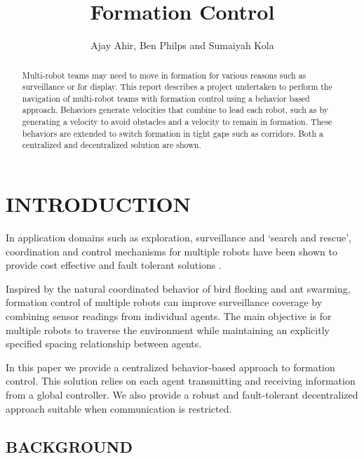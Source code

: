 \documentclass[letterpaper, 10 pt, conference]{ieeeconf}  %
\title{\LARGE \bf Formation Control}
\author{Ajay Ahir, Ben Philps and Sumaiyah Kola}
\begin{document}
\maketitle
\thispagestyle{empty}
\pagestyle{empty}

\begin{abstract}

Multi-robot teams may need to move in formation for various reasons such as surveillance or for display. This report describes a project undertaken to perform the navigation of multi-robot teams with formation control using a behavior based approach. Behaviors generate velocities that combine to lead each robot, such as by generating a velocity to avoid obstacles and a velocity to remain in formation. These behaviors are extended to switch formation in tight gaps such as corridors. Both a centralized and decentralized solution are shown.

\end{abstract}

\section{INTRODUCTION}

In application domains such as exploration, surveillance and `search and rescue', coordination and control mechanisms for multiple robots have been shown to provide cost effective and fault tolerant solutions \cite{c1}.

Inspired by the natural coordinated behavior of bird flocking and ant swarming, formation control of multiple robots can improve surveillance coverage by combining sensor readings from individual agents. The main objective is for multiple robots to traverse the environment while maintaining an explicitly specified spacing relationship between agents.

In this paper we provide a centralized behavior-based approach to formation control. This solution relies on each agent transmitting and receiving information from a global controller. We also provide a robust and fault-tolerant decentralized approach suitable when communication is restricted.

\subsection{BACKGROUND}
\end{document}
